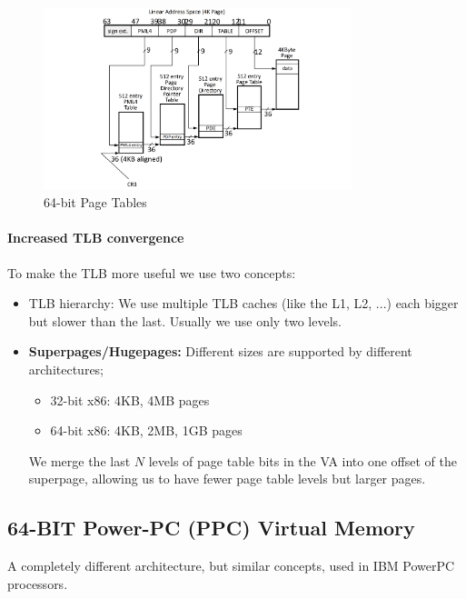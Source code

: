 \documentclass[openany,12pt]{book}
\begin{document}
\begin{figure}[H]
    \centering
    \includegraphics[width=0.8\textwidth]{64bit-tables.png}
    \caption{64-bit Page Tables}
\end{figure}



\paragraph{Increased TLB convergence} To make the TLB more useful we use two concepts:
\begin{itemize}
  \item TLB hierarchy: We use multiple TLB caches (like the L1, L2, ...) each bigger but slower than the last. Usually we use only two levels.
  
  \item \textbf{Superpages/Hugepages:} Different sizes are supported by different architectures;
  \begin{itemize}
    \item 32-bit x86: 4KB, 4MB pages
    \item 64-bit x86: 4KB, 2MB, 1GB pages
  \end{itemize}
  We merge the last \(N\) levels of page table bits in the VA into one offset of the superpage, allowing us to have fewer page table levels but larger pages.
\end{itemize}


\subsection*{64-BIT Power-PC (PPC) Virtual Memory}

A completely different architecture, but similar concepts, used in IBM PowerPC processors. 
\end{document}
